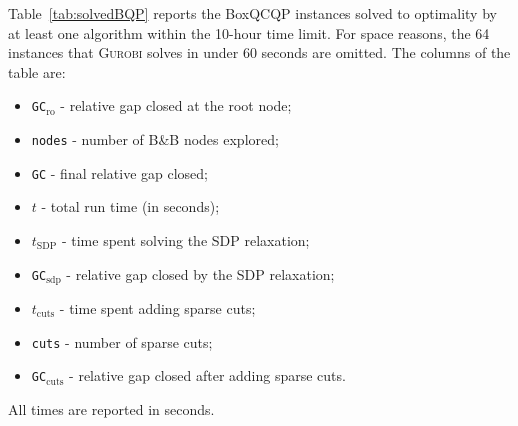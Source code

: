 \documentclass[twoside]{article}
\begin{document}
	Table~\ref{tab:solvedBQP} reports the BoxQCQP instances solved to optimality by at least one algorithm within the 10-hour time limit. For space reasons, the 64 instances that \textsc{Gurobi} solves in under 60 seconds are omitted. %
	The columns of the table are: 
	\begin{itemize}\itemsep -.1cm
		\item[-] \texttt{GC}$_{\mathrm{ro}}$ - relative gap closed at the root node; 
		\item[-] \texttt{nodes} - number of B\&B nodes explored; \item[-]\texttt{GC} - final relative gap closed; 
		\item[-]$t$ - total run time (in seconds); 
		\item[-]$t_{\mathrm{SDP}}$ - time spent solving the SDP relaxation; 
		\item[-] \texttt{GC}$_{\mathrm{sdp}}$ - relative gap closed by the SDP relaxation; 
		\item[-]$t_{\mathrm{cuts}}$ - time spent adding sparse cuts; 
		\item[-] \texttt{cuts} - number of sparse cuts; 
		\item[-] \texttt{GC}$_{\mathrm{cuts}}$ - relative gap closed after adding sparse cuts. 
	\end{itemize}
	All times are reported in seconds. 
\end{document}
